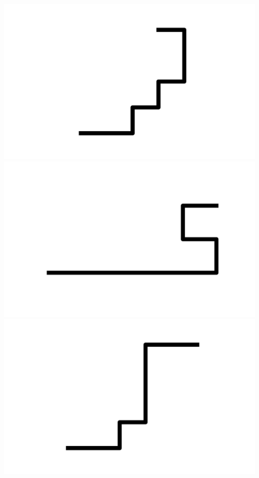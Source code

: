 \documentclass[]{report}
\begin{document}
\includegraphics[scale=.1]{pictures/21/state_cluster_shapes_88.pdf} 
\includegraphics[scale=.1]{pictures/21/state_cluster_shapes_89.pdf} 
\includegraphics[scale=.1]{pictures/21/state_cluster_shapes_90.pdf} 
\end{document}
